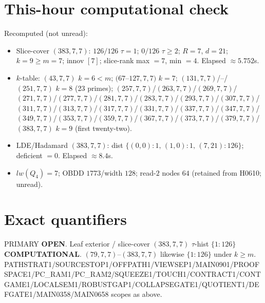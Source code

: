 \documentclass[11pt]{article}
\begin{document}
\section*{This-hour computational check}
Recomputed (not unread):
\begin{itemize}
\item Slice-cover $(383,7,7)$: $126/126$ $\tau{=}1$; $0/126$ $\tau{\ge}2$; $R{=}7$, $d{=}21$;
  $k{=}9{\ge}m{=}7$; innov $[7]$; slice-rank max $=7$, min $=4$. Elapsed $\approx5.752$s.
\item $k$-table: $(43,7,7)$ $k{=}6{<}m$; $(67$--$127,7,7)$ $k{=}7$;
  $(131,7,7)$/--/$(251,7,7)$ $k{=}8$ (23 primes); $(257,7,7)$/$(263,7,7)$/$(269,7,7)$/$(271,7,7)$/$(277,7,7)$/$(281,7,7)$/$(283,7,7)$/$(293,7,7)$/$(307,7,7)$/$(311,7,7)$/$(313,7,7)$/$(317,7,7)$/$(331,7,7)$/$(337,7,7)$/$(347,7,7)$/$(349,7,7)$/$(353,7,7)$/$(359,7,7)$/$(367,7,7)$/$(373,7,7)$/$(379,7,7)$/$(383,7,7)$ $k{=}9$ (first twenty-two).
\item LDE/Hadamard $(383,7,7)$: dist $\{(0,0){:}1,\,(1,0){:}1,\,(7,21){:}126\}$; deficient $=0$. Elapsed $\approx8.4$s.
\item $lw(Q_4)=7$; OBDD $1773$/width $128$; read-$2$ nodes $64$ (retained from H0610; unread).
\end{itemize}

\section*{Exact quantifiers}
PRIMARY \textbf{OPEN}. Leaf exterior / slice-cover $(383,7,7)$ $\tau$-hist $\{1{:}126\}$ \textbf{COMPUTATIONAL}.
$(79,7,7)$--$(383,7,7)$ likewise $\{1{:}126\}$ under $k{\ge}m$.
PATHSTRAT1/SOURCESTOP1/OFFPATH1/VIEWSEP1/MAIN0901/PROOFSPACE1/PC\_RAM1/PC\_RAM2/SQUEEZE1/TOUCH1/CONTRACT1/CONTGAME1/LOCALSEM1/ROBUSTGAP1/COLLAPSEGATE1/QUOTIENT1/DEFGATE1/MAIN0358/MAIN0658 scopes as above.
\end{document}
